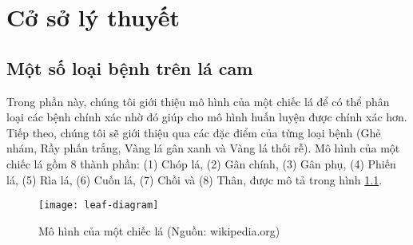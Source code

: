 \chapter{Cở sở lý thuyết} \label{chapter02}

\section{Một số loại bệnh trên lá cam}
Trong phần này, chúng tôi giới thiệu mô hình của một chiếc lá để có thể phân loại các bệnh chính xác nhờ đó giúp cho mô hình huấn luyện được chính xác hơn. Tiếp theo, chúng tôi sẽ giới thiệu qua các đặc điểm của từng loại bệnh (Ghẻ nhám, Rầy phấn trắng, Vàng lá gân xanh và Vàng lá thối rễ). Mô hình của một chiếc lá gồm 8 thành phần: (1) Chóp lá, (2) Gân chính, (3) Gân phụ, (4) Phiến lá, (5) Rìa lá, (6) Cuốn lá, (7) Chồi và (8) Thân, được mô tả trong hình \ref{fig:leaf-diagram}.

\begin{figure}[h]
	\centering
	\texttt{[image: leaf-diagram]}
	\caption[Mô hình của một chiếc lá]{Mô hình của một chiếc lá (Nguồn: wikipedia.org)}
	\label{fig:leaf-diagram}
\end{figure}

